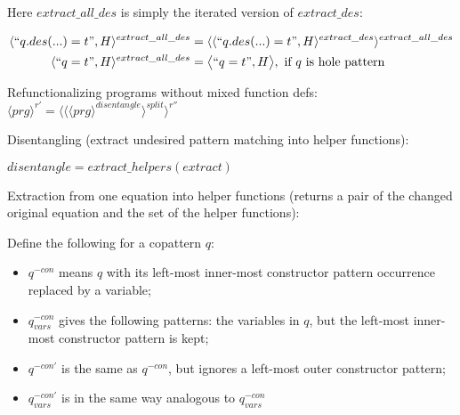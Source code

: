 \documentclass[11pt]{article} %
\begin{document}
Here $extract\_all\_des$ is simply the iterated version of $extract\_des$:

\begin{alignat*}{2}
\langle `` q.des(...) = t ", H \rangle^{extract\_all\_des} & = \langle \langle `` q.des(...) = t ", H \rangle^{extract\_des} \rangle^{extract\_all\_des} \\
\langle `` q = t ", H \rangle^{extract\_all\_des} & = \big\langle `` q = t ", H \big\rangle, \textrm{ if $q$ is hole pattern}
\end{alignat*}

Refunctionalizing programs without mixed function defs: $\langle prg \rangle^{r'} = \langle \langle \langle prg \rangle^{disentangle} \rangle^{split} \rangle^{r''}$

Disentangling (extract undesired pattern matching into helper functions):

$disentangle = extract\_helpers(extract)$

Extraction from one equation into helper functions (returns a pair of the changed original equation and the set of the helper functions):

Define the following for a copattern $q$:

\begin{itemize}
\item $q^{-con}$ means $q$ with its left-most inner-most constructor pattern occurrence replaced by a variable;
\item $q^{-con}_{vars}$ gives the following patterns: the variables in $q$, but the left-most inner-most constructor pattern is kept;
\item $q^{-con'}$ is the same as $q^{-con}$, but ignores a left-most outer constructor pattern;
\item $q^{-con'}_{vars}$ is in the same way analogous to $q^{-con}_{vars}$
\end{itemize}
\end{document}
